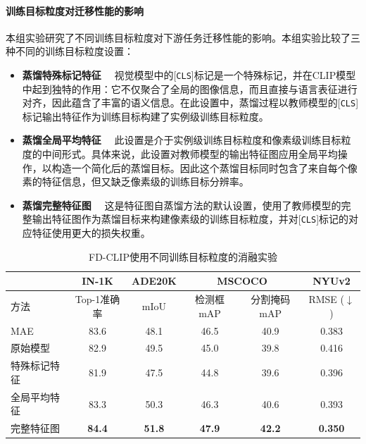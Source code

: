 \paragraph{训练目标粒度对迁移性能的影响} 本组实验研究了不同训练目标粒度对下游任务迁移性能的影响。本组实验比较了三种不同的训练目标粒度设置：
\begin{itemize}
    \item \textbf{蒸馏特殊标记特征}~~ 视觉模型中的[\texttt{CLS}]标记是一个特殊标记，并在CLIP模型中起到独特的作用：它不仅聚合了全局的图像信息，而且直接与语言表征进行对齐，因此蕴含了丰富的语义信息。在此设置中，蒸馏过程以教师模型的[\texttt{CLS}]标记输出特征作为训练目标构建了实例级训练目标粒度。
    \item \textbf{蒸馏全局平均特征}~~ 此设置是介于实例级训练目标粒度和像素级训练目标粒度的中间形式。具体来说，此设置对教师模型的输出特征图应用全局平均操作，以构造一个简化后的蒸馏目标。因此这个蒸馏目标同时包含了来自每个像素的特征信息，但又缺乏像素级的训练目标分辨率。
    \item \textbf{蒸馏完整特征图}~~ 这是特征图自蒸馏方法的默认设置，使用了教师模型的完整输出特征图作为蒸馏目标来构建像素级的训练目标粒度，并对[\texttt{CLS}]标记的对应特征使用更大的损失权重。
\end{itemize}

\begin{table}
\caption{FD-CLIP使用不同训练目标粒度的消融实验}
\centering
  \begin{tabular}{lccccc}
\toprule
   & IN-1K & ADE20K & \multicolumn{2}{c}{MSCOCO} & NYUv2 \\
   \midrule

   方法 &  Top-1准确率   &  mIoU  & 检测框mAP & 分割掩码mAP & RMSE\scriptsize{ ($\downarrow$)}\\
  \midrule

  MAE & 83.6 & 48.1 & 46.5 & 40.9 & 0.383 \\
    原始模型 & 82.9 & 49.5 & 45.0 & 39.8 & 0.416 \\ 
  \midrule
  特殊标记特征 & 81.9 & 47.5 & 44.8 & 39.6 & 0.396 \\
  全局平均特征  & 83.3 & 50.3 & 46.3 & 40.6 & 0.393 \\
  完整特征图 & \textbf{84.4} & \textbf{51.8} & \textbf{47.9} & \textbf{42.2} & \textbf{0.350} \\
\bottomrule
  \end{tabular}
\label{tab:fd-ablation_targets}
\end{table}

